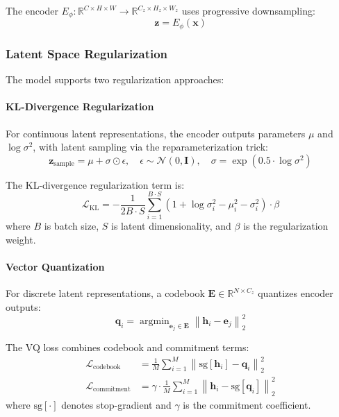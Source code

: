 \documentclass[12pt,twoside]{article}
\DeclareMathOperator{\argmin}{argmin}
\newcommand{\RR}{\mathbb{R}}
\newcommand{\KL}{\text{KL}}
\newcommand{\norm}[1]{\left\|#1\right\|}
\begin{document}
The encoder $E_\phi: \RR^{C \times H \times W} \to \RR^{C_z \times H_z \times W_z}$ uses progressive downsampling:
\begin{equation}
\label{eq:encoder_mapping}
\mathbf{z} = E_\phi(\mathbf{x})
\end{equation}

\subsubsection{Latent Space Regularization}
\label{subsubsec:latent_regularization}

The model supports two regularization approaches:

\paragraph{KL-Divergence Regularization}
For continuous latent representations, the encoder outputs parameters $\mu$ and $\log \sigma^2$, with latent sampling via the reparameterization trick:
\begin{equation}
\label{eq:reparameterization}
\mathbf{z}_{\text{sample}} = \mu + \sigma \odot \epsilon, \quad \epsilon \sim \mathcal{N}(0, \mathbf{I}), \quad \sigma = \exp(0.5 \cdot \log \sigma^2)
\end{equation}

The KL-divergence regularization term is:
\begin{equation}
\label{eq:kl_regularization}
\mathcal{L}_{\KL} = -\frac{1}{2B \cdot S} \sum_{i=1}^{B \cdot S} \left( 1 + \log \sigma_i^2 - \mu_i^2 - \sigma_i^2 \right) \cdot \beta
\end{equation}
where $B$ is batch size, $S$ is latent dimensionality, and $\beta$ is the regularization weight.

\paragraph{Vector Quantization}
For discrete latent representations, a codebook $\mathbf{E} \in \RR^{N \times C_z}$ quantizes encoder outputs:
\begin{equation}
\label{eq:vector_quantization}
\mathbf{q}_i = \argmin_{\mathbf{e}_j \in \mathbf{E}} \norm{\mathbf{h}_i - \mathbf{e}_j}_2^2
\end{equation}

The VQ loss combines codebook and commitment terms:
\begin{align}
\label{eq:vq_loss}
\mathcal{L}_{\text{codebook}} &= \frac{1}{M} \sum_{i=1}^M \norm{\text{sg}[\mathbf{h}_i] - \mathbf{q}_i}_2^2 \\
\mathcal{L}_{\text{commitment}} &= \gamma \cdot \frac{1}{M} \sum_{i=1}^M \norm{\mathbf{h}_i - \text{sg}[\mathbf{q}_i]}_2^2 \nonumber
\end{align}
where $\text{sg}[\cdot]$ denotes stop-gradient and $\gamma$ is the commitment coefficient.
\end{document}
